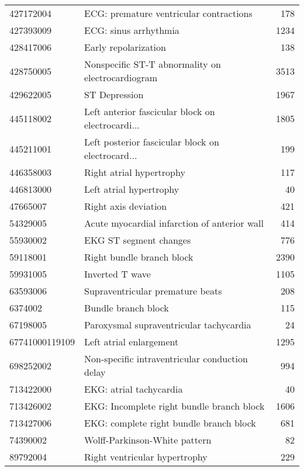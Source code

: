 \begin{tabular}{llr}
427172004      &            ECG: premature ventricular contractions &    178 \\
427393009      &                              ECG: sinus arrhythmia &   1234 \\
428417006      &                               Early repolarization &    138 \\
428750005      &  Nonspecific ST-T abnormality on electrocardiogram &   3513 \\
429622005      &                                      ST Depression &   1967 \\
445118002      &  Left anterior fascicular block on electrocardi... &   1805 \\
445211001      &  Left posterior fascicular block on electrocard... &    199 \\
446358003      &                           Right atrial hypertrophy &    117 \\
446813000      &                            Left atrial hypertrophy &     40 \\
47665007       &                               Right axis deviation &    421 \\
54329005       &       Acute myocardial infarction of anterior wall &    414 \\
55930002       &                             EKG ST segment changes &    776 \\
59118001       &                          Right bundle branch block &   2390 \\
59931005       &                                    Inverted T wave &   1105 \\
63593006       &                   Supraventricular premature beats &    208 \\
6374002        &                                Bundle branch block &    115 \\
67198005       &            Paroxysmal supraventricular tachycardia &     24 \\
67741000119109 &                            Left atrial enlargement &   1295 \\
698252002      &     Non-specific intraventricular conduction delay &    994 \\
713422000      &                            EKG: atrial tachycardia &     40 \\
713426002      &          EKG: Incomplete right bundle branch block &   1606 \\
713427006      &            EKG: complete right bundle branch block &    681 \\
74390002       &                      Wolff-Parkinson-White pattern &     82 \\
89792004       &                      Right ventricular hypertrophy &    229 \\
\bottomrule
\end{tabular}
